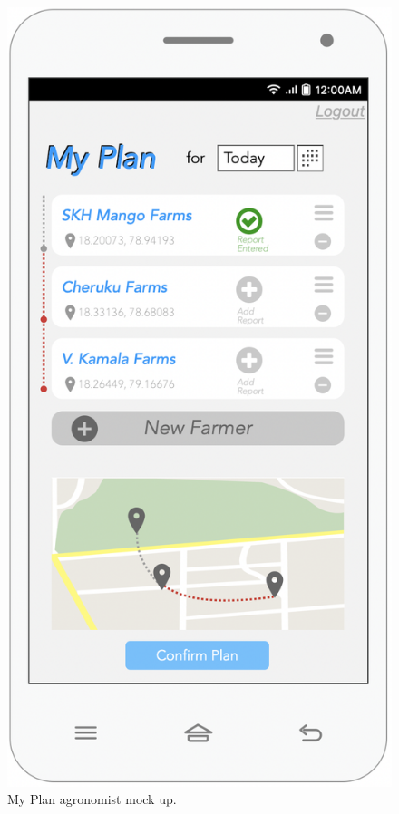 \begin{multicols}{2}
\begin{figure}[H]
\centering
\includegraphics[scale=0.5]{../images_diagrams/mock_ups/myplan100.png}
\caption{\label{fig:mock_plan}My Plan agronomist mock up.}
\end{figure}
\end{multicols}

